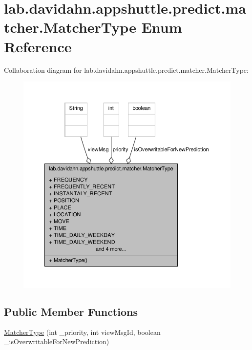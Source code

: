 \hypertarget{enumlab_1_1davidahn_1_1appshuttle_1_1predict_1_1matcher_1_1_matcher_type}{\section{lab.\-davidahn.\-appshuttle.\-predict.\-matcher.\-Matcher\-Type \-Enum \-Reference}
\label{enumlab_1_1davidahn_1_1appshuttle_1_1predict_1_1matcher_1_1_matcher_type}
}


\-Collaboration diagram for lab.\-davidahn.\-appshuttle.\-predict.\-matcher.\-Matcher\-Type\-:
\nopagebreak
\begin{figure}[H]
\begin{center}
\leavevmode
\includegraphics[width=350pt]{enumlab_1_1davidahn_1_1appshuttle_1_1predict_1_1matcher_1_1_matcher_type__coll__graph}
\end{center}
\end{figure}
\subsection*{\-Public \-Member \-Functions}
\begin{DoxyCompactItemize}
\item 
\hyperlink{enumlab_1_1davidahn_1_1appshuttle_1_1predict_1_1matcher_1_1_matcher_type_a83229b2a85abc4f7d1d08c5243a0e99e}{\-Matcher\-Type} (int \-\_\-priority, int view\-Msg\-Id, boolean \-\_\-is\-Overwritable\-For\-New\-Prediction)
\end{DoxyCompactItemize}
